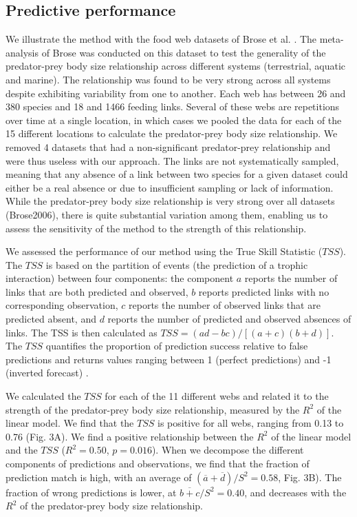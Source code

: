 \documentclass[12pt]{article}
\begin{document}
\subsection{Predictive performance}
We illustrate the method with the food web datasets of Brose et al.
\parencite{Brose2005}. The meta-analysis of Brose \parencite{Brose2006} was
conducted on this dataset to test the generality of the predator-prey body size
relationship across different systems (terrestrial, aquatic and marine). The
relationship was found to be very strong across all systems despite exhibiting
variability from one to another. Each web has between 26 and 380 species and 18
and 1466 feeding links. Several of these webs are repetitions over time at a
single location, in which cases we pooled the data for each of the 15 different
locations to calculate the predator-prey body size relationship. We removed 4
datasets that had a non-significant predator-prey relationship and were thus
useless with our approach. The links are not systematically sampled, meaning
that any absence of a link between two species for a given dataset could either
be a real absence or due to insufficient sampling or lack of information. While
the predator-prey body size relationship is very strong over all datasets
(Brose2006), there is quite substantial variation among them, enabling us to
assess the sensitivity of the method to the strength of this relationship.

We assessed the performance of our method using the True Skill Statistic
($TSS$). The $TSS$ is based on the partition of events (the prediction of a
trophic interaction) between four components: the component $a$ reports the
number of links that are both predicted and observed, $b$ reports predicted
links with no corresponding observation, $c$ reports the number of observed
links that are predicted absent, and $d$ reports the number of predicted and
observed absences of links. The TSS is then calculated as $TSS
=(ad-bc)/\left[(a+c)(b+d)\right]$. The $TSS$ quantifies the proportion of
prediction success relative to false predictions and returns values ranging
between 1 (perfect predictions) and -1 (inverted forecast)
\parencite{Allouche2006}.

We calculated the $TSS$ for each of the 11 different webs and related it to the
strength of the predator-prey body size relationship, measured by the $R^2$ of
the linear model. We find that the $TSS$ is positive for all webs, ranging from
0.13 to 0.76 (Fig. 3A). We find a positive relationship between the $R^2$ of the
linear model and the $TSS$ ($R^2=0.50$, $p=0.016$). When we decompose the
different components of predictions and observations, we find that the fraction
of prediction match is high, with an average of
$(\overline{a}+\overline{d})/{S^2}=0.58$, Fig. 3B). The fraction of wrong
predictions is lower, at $\overline{b+c}/S^2=0.40$, and decreases with the $R^2$
of the predator-prey body size relationship.
\end{document}

